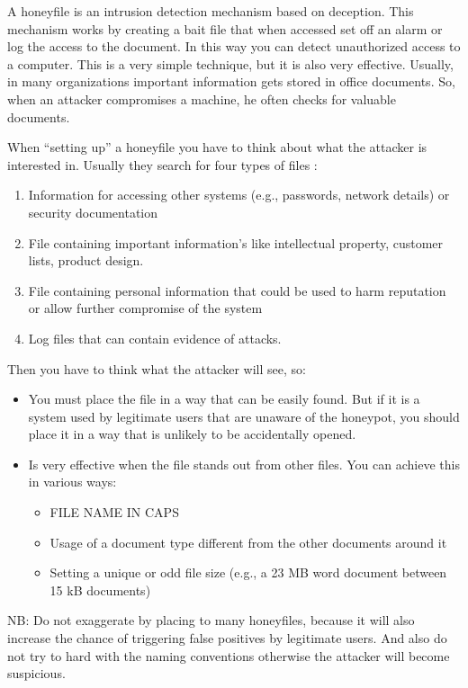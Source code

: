 \documentclass[epsfig,a4paper,11pt,titlepage,oneside,openany]{book}
\begin{document}
A honeyfile is an intrusion detection mechanism based on deception. This mechanism works by creating a bait file that when accessed set off an alarm or log the access to the document. In this way you can detect unauthorized access to a computer. This is a very simple technique, but it is also very effective. Usually, in many organizations important information gets stored in office documents. So, when an attacker compromises a machine, he often checks for valuable documents.

When “setting up” a honeyfile you have to think about what the attacker is interested in. Usually they search for four types of files \cite{deceptive_files}:
\begin{enumerate}
\itemsep0em 
\item Information for accessing other systems (e.g., passwords, network details) or security documentation
\item File containing important information's like intellectual property, customer lists, product design.
\item File containing personal information that could be  used to harm reputation or allow further compromise of the system
\item Log files that can contain evidence of attacks.
\end{enumerate}

Then you have to think what the attacker will see, so:
\begin{itemize}
\itemsep0em
\item You must place the file in a way that can be easily found. But if it is a system used by legitimate users that are unaware of the honeypot, you should place it in a way that is unlikely to be accidentally opened.
\item Is very effective when the file stands out from other files. You can achieve this in various ways:
	\begin{itemize}
	\itemsep0em
	\item FILE NAME IN CAPS
	\item Usage of a document type different from the other documents around it
	\item Setting a unique or odd file size (e.g., a 23 MB word document between 15 kB documents)
	\end{itemize}
\end{itemize}

\noindent NB: Do not exaggerate by placing to many honeyfiles, because it will also increase the chance of triggering false positives by legitimate users. And also do not try to hard with the naming conventions otherwise the attacker will become suspicious.
\end{document}
